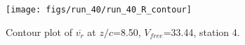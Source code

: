 \begin{figure}[H]
\centering
\texttt{[image: figs/run\_40/run\_40\_R\_contour]}
\caption{Contour plot of $\overline{v_{r}}$ at $z/c$=8.50, $V_{free}$=33.44, station 4.}
\label{fig:run_40_R_contour}
\end{figure}



